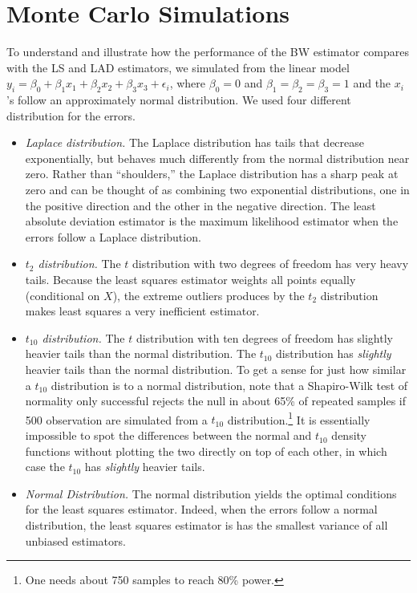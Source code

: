 \documentclass[12pt]{article}
\begin{document}
\section*{Monte Carlo Simulations}

To understand and illustrate how the performance of the BW estimator compares with the LS and LAD estimators, we simulated from the linear model $y_i = \beta_0 + \beta_1x_1 + \beta_2 x_2 + \beta_3 x_3 + \epsilon_i$, where $\beta_0 = 0$ and $\beta_1 = \beta_2 = \beta_3 = 1$ and the $x_i$'s follow an approximately normal distribution. We used four different distribution for the errors.
\begin{itemize}
\item \textit{Laplace distribution.} The Laplace distribution has tails that decrease exponentially, but behaves much differently from the normal distribution near zero. Rather than ``shoulders,'' the Laplace distribution has a sharp peak at zero and can be thought of as combining two exponential distributions, one in the positive direction and the other in the negative direction. The least absolute deviation estimator is the maximum likelihood estimator when the errors follow a Laplace distribution.
\item \textit{$t_2$ distribution.} The $t$ distribution with two degrees of freedom has very heavy tails. Because the least squares estimator weights all points equally (conditional on $X$), the extreme outliers produces by the $t_2$ distribution makes least squares a very inefficient estimator.
\item \textit{$t_{10}$ distribution.} The $t$ distribution with ten degrees of freedom has slightly heavier tails than the normal distribution. The $t_10$ distribution has \textit{slightly} heavier tails than the normal distribution. To get a sense for just how similar a $t_{10}$ distribution is to a normal distribution, note that a Shapiro-Wilk test of normality only successful rejects the null in about 65\% of repeated samples if 500 observation are simulated from a $t_{10}$ distribution.\footnote{One needs about 750 samples to reach 80\% power.} It is essentially impossible to spot the differences between the normal and $t_{10}$ density functions without plotting the two directly on top of each other, in which case the $t_{10}$ has \textit{slightly} heavier tails.
\item \textit{Normal Distribution.} The normal distribution yields the optimal conditions for the least squares estimator. Indeed, when the errors follow a normal distribution, the least squares estimator is has the smallest variance of all unbiased estimators. 
\end{itemize}
\end{document}
